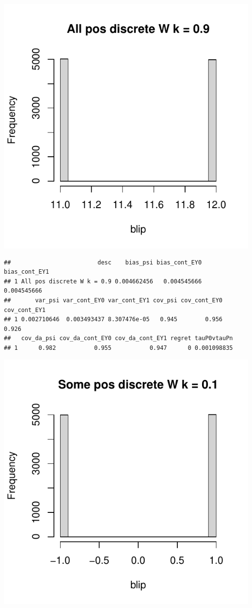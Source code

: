 \documentclass[11pt]{article}\usepackage[]{graphicx}\usepackage[table]{xcolor}
\makeatletter
\def\maxwidth{ %
  \ifdim\Gin@nat@width>\linewidth
    \linewidth
  \else
    \Gin@nat@width
  \fi
}
\newenvironment{kframe}{%
 \def\at@end@of@kframe{}%
 \ifinner\ifhmode%
  \def\at@end@of@kframe{\end{minipage}}%
  \begin{minipage}{\columnwidth}%
 \fi\fi%
 \def\FrameCommand##1{\hskip\@totalleftmargin \hskip-\fboxsep
 \colorbox{shadecolor}{##1}\hskip-\fboxsep
     \hskip-\linewidth \hskip-\@totalleftmargin \hskip\columnwidth}%
 \MakeFramed {\advance\hsize-\width
   \@totalleftmargin\z@ \linewidth\hsize
   \@setminipage}}%
 {\par\unskip\endMakeFramed%
 \at@end@of@kframe}
\newenvironment{knitrout}{}{} %
\makeatother
\begin{document}
\begin{knitrout}
\includegraphics[width=\maxwidth]{figure/unnamed-chunk-4-2} 
\begin{kframe}\begin{verbatim}
##                         desc    bias_psi bias_cont_EY0 bias_cont_EY1
## 1 All pos discrete W k = 0.9 0.004662456   0.004545666   0.004545666
##       var_psi var_cont_EY0 var_cont_EY1 cov_psi cov_cont_EY0 cov_cont_EY1
## 1 0.002710646  0.003493437 8.307476e-05   0.945        0.956        0.926
##   cov_da_psi cov_da_cont_EY0 cov_da_cont_EY1 regret tauP0vtauPn
## 1      0.982           0.955           0.947      0 0.001098835
\end{verbatim}
\end{kframe}
\includegraphics[width=\maxwidth]{figure/unnamed-chunk-4-3} 

\end{knitrout}
\end{document}
